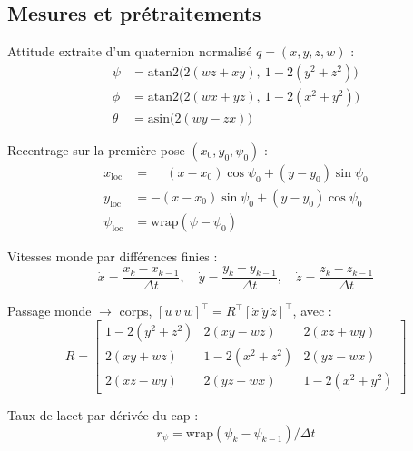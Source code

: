 \documentclass{rapportEILCO}
\begin{document}
\begin{appendix}
		\subsection{Mesures et prétraitements}
		\label{app:mesures}
		
		
		Attitude extraite d'un quaternion normalisé $q=(x,y,z,w)$ :
		\begin{align}
			\psi    &= \mathrm{atan2}\big(2(wz+xy),\ 1-2(y^{2}+z^{2})\big) \label{eq:yaw}\\
			\phi    &= \mathrm{atan2}\big(2(wx+yz),\ 1-2(x^{2}+y^{2})\big) \label{eq:roll}\\
			\theta  &= \mathrm{asin}\big(2(wy-zx)\big)                    \label{eq:pitch}
		\end{align}
		
		Recentrage sur la première pose $(x_{0},y_{0},\psi_{0})$ :
		\begin{equation}
			\begin{aligned}
				x_{\mathrm{loc}} &= \phantom{-}(x-x_{0})\cos\psi_{0} + (y-y_{0})\sin\psi_{0}\\
				y_{\mathrm{loc}} &= -(x-x_{0})\sin\psi_{0} + (y-y_{0})\cos\psi_{0}\\
				\psi_{\mathrm{loc}} &= \mathrm{wrap}(\psi-\psi_{0})
			\end{aligned}
			\label{eq:local}
		\end{equation}
		
		Vitesses monde par différences finies :
		\begin{equation}
			\dot{x} = \frac{x_{k}-x_{k-1}}{\Delta t},\quad
			\dot{y} = \frac{y_{k}-y_{k-1}}{\Delta t},\quad
			\dot{z} = \frac{z_{k}-z_{k-1}}{\Delta t}
			\label{eq:vworld}
		\end{equation}
		
		Passage monde $\rightarrow$ corps, $[u\ v\ w]^{\top} = R^{\top}[\dot{x}\ \dot{y}\ \dot{z}]^{\top}$, avec :
		\begin{equation}
			R=\begin{bmatrix}
				1-2(y^{2}+z^{2}) & 2(xy-wz)       & 2(xz+wy)\\
				2(xy+wz)         & 1-2(x^{2}+z^{2}) & 2(yz-wx)\\
				2(xz-wy)         & 2(yz+wx)       & 1-2(x^{2}+y^{2})
			\end{bmatrix}
			\label{eq:rotmat}
		\end{equation}
		
		Taux de lacet par dérivée du cap :
		\begin{equation}
			r_{\psi} = \mathrm{wrap}(\psi_{k}-\psi_{k-1})/\Delta t
			\label{eq:ryaw}
		\end{equation}
		

\end{appendix}
\end{document}
